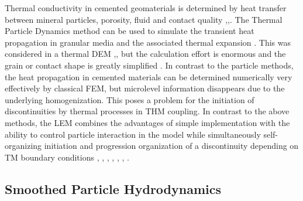Thermal conductivity in cemented geomaterials is determined by heat transfer between mineral particles, porosity, fluid and contact quality 
\cite{Woodside19611688},\cite{Bahrami20063691},\cite{Widenfeld200315}.
The Thermal Particle Dynamics method can be used to simulate the transient heat propagation in granular media and the associated thermal expansion \cite{Vargas20011052}. This was considered in a thermal DEM \cite{Vargas20023119},\cite{Vargas2007}, but the calculation effort is enormous and the grain or contact shape is greatly simplified \cite{Zhang2011172}. In contrast to the particle methods, the heat propagation in cemented materials can be determined numerically very effectively by classical FEM, but microlevel information disappears due to the underlying homogenization. This poses a problem for the initiation of discontinuities by thermal processes in THM coupling. In contrast to the above methods, the LEM combines the advantages of simple implementation with the ability to control particle interaction in the model while simultaneously self-organizing initiation and progression organization of a discontinuity depending on TM boundary conditions \cite{Sattarietal2017}, \cite{Sattarietal2019b}, \cite{Rizvietal2019d}, \cite{Rizvietal2018b}, \cite{Rizvietal2016}, \cite{Shresthaetal2019}, \cite{Wuttke201785}.

\subsection{Smoothed Particle Hydrodynamics}

